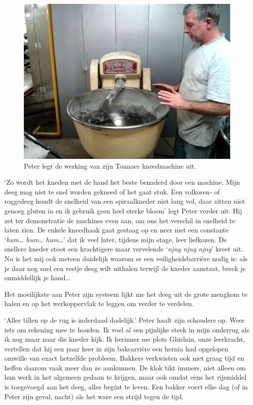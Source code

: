 \documentclass[
  11pt,
  dutch,
]{memoir}
\begin{document}
\begin{figure}
    \centering
    \includegraphics{img/bw/peter1.jpg}
    \caption[Peter legt de werking van zijn kneedmachine uit.]{Peter legt de werking van zijn Tonnaer kneedmachine uit.}
\end{figure}

`Zo wordt het kneden met de hand het beste benaderd door een machine.
Mijn deeg mag niet te snel worden gekneed of het gaat stuk. Een
volkoren- of roggedeeg houdt de snelheid van een spiraalkneder niet lang
vol, daar zitten niet genoeg gluten in en ik gebruik geen heel sterke
bloem' legt Peter verder uit. Hij zet ter demonstratie de machines even
aan, om ons het verschil in snelheid te laten zien. De enkele kneedhaak
gaat gestaag op en neer met een constante `\emph{hum\ldots{} hum\ldots{}
hum\ldots{}}' dat ik veel later, tijdens mijn stage, leer liefkozen. De
snellere kneder stoot een krachtigere maar vervelende `\emph{njng njng
njng}' kreet uit. Nu is het mij ook meteen duidelijk waarom er een
veiligheidsbarrière nodig is: als je daar nog snel een restje deeg wilt
uithalen terwijl de kneder aanstaat, breek je onmiddellijk je
hand\ldots{}

Het moeilijkste aan Peter zijn systeem lijkt me het deeg uit de grote
mengkom te halen en op het werkoppervlak te leggen om verder te
verdelen.

`Alles tillen op de rug is inderdaad dodelijk.' Peter haalt zijn
schouders op. Weer iets om rekening mee te houden. Ik voel al een
pijnlijke steek in mijn onderrug als ik nog maar naar die kneder kijk.
Ik herinner me plots Ghislain, onze leerkracht, vertellen dat hij een
paar keer in zijn bakcarrière een hernia had opgelopen omwille van exact
hetzelfde probleem. Bakkers verkwisten ook niet graag tijd en heffen
daarom vaak meer dan ze aankunnen. De klok tikt immers, niet alleen om
hun werk in het algemeen gedaan te krijgen, maar ook omdat eens het
rijsmiddel is toegevoegd aan het deeg, alles begint te leven. Een bakker
voert elke dag (of in Peter zijn geval, nacht) als het ware een strijd
tegen de tijd.
\end{document}
